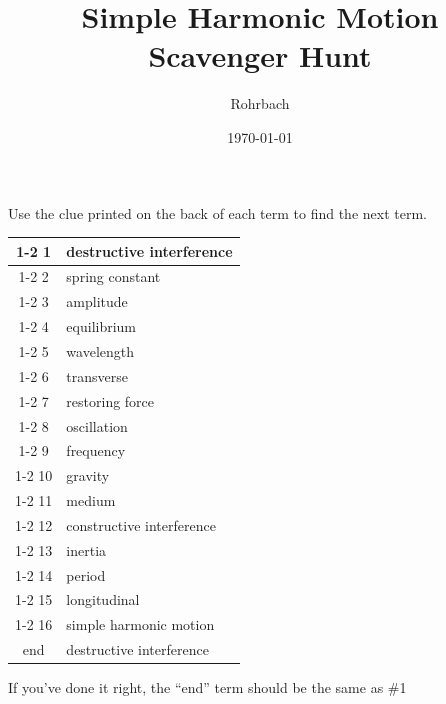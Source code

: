 \documentclass[10pt]{exam}
\title{Simple Harmonic Motion Scavenger Hunt}
\author{Rohrbach}
\date{\today}
\begin{document}
\maketitle

\renewcommand{\arraystretch}{2.5}

\noindent
Use the clue printed on the back of each term to find the next term.  

\vspace{2em}

\newcommand{\isanswer}[1]{\ifprintanswers #1 \fi}

\begin{tabular}{|c|p{20em}|}
  \cline{1-2}
  1 & \isanswer{destructive interference}\\\cline{1-2}
  2 & \isanswer{spring constant} \\\cline{1-2}
  3 & \isanswer{amplitude} \\\cline{1-2}
  4 & \isanswer{equilibrium} \\\cline{1-2}
  5 & \isanswer{wavelength} \\\cline{1-2}
  6 & \isanswer{transverse} \\\cline{1-2}
  7 & \isanswer{restoring force} \\\cline{1-2}
  8 & \isanswer{oscillation} \\\cline{1-2}
  9 & \isanswer{frequency} \\\cline{1-2}
  10 & \isanswer{gravity} \\\cline{1-2}
  11 & \isanswer{medium} \\\cline{1-2}
  12 & \isanswer{constructive interference} \\\cline{1-2}
  13 & \isanswer{inertia} \\\cline{1-2}
  14 & \isanswer{period} \\\cline{1-2}
  15 & \isanswer{longitudinal} \\\cline{1-2}
  16 & \isanswer{simple harmonic motion} \\\hline
  end & \isanswer{destructive interference} \\\hline
\end{tabular}

\vspace{2em}

\noindent
If you've done it right, the ``end'' term should be the same as \#1
\end{document}
